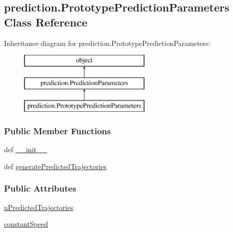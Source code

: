 \hypertarget{classprediction_1_1PrototypePredictionParameters}{\subsection{prediction.\-Prototype\-Prediction\-Parameters Class Reference}
\label{classprediction_1_1PrototypePredictionParameters}
}
Inheritance diagram for prediction.\-Prototype\-Prediction\-Parameters\-:\begin{figure}[H]
\begin{center}
\leavevmode
\includegraphics[height=3.000000cm]{classprediction_1_1PrototypePredictionParameters}
\end{center}
\end{figure}
\subsubsection*{Public Member Functions}
\begin{DoxyCompactItemize}
\item 
def \hyperlink{classprediction_1_1PrototypePredictionParameters_aa5c1e1232db2a079921b21483b73f0c8}{\-\_\-\-\_\-init\-\_\-\-\_\-}
\item 
def \hyperlink{classprediction_1_1PrototypePredictionParameters_a9499e218822cfd8ee3236822c203a3fb}{generate\-Predicted\-Trajectories}
\end{DoxyCompactItemize}
\subsubsection*{Public Attributes}
\begin{DoxyCompactItemize}
\item 
\hyperlink{classprediction_1_1PrototypePredictionParameters_ae4b267ae335ef578d64ee0a438ccfd3a}{n\-Predicted\-Trajectories}
\item 
\hyperlink{classprediction_1_1PrototypePredictionParameters_ab70c4623b54e5948decc19fa10336183}{constant\-Speed}
\end{DoxyCompactItemize}


